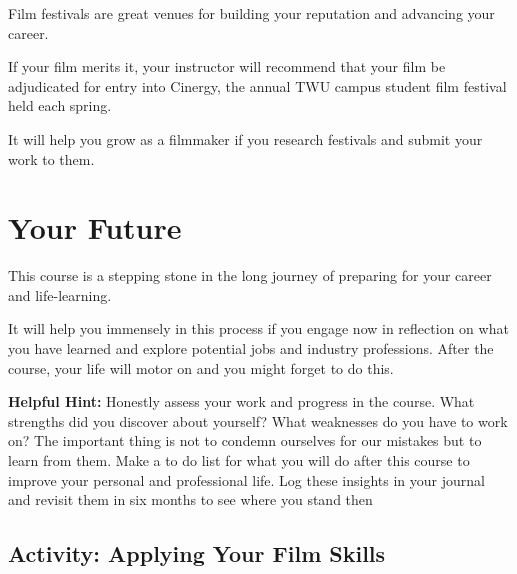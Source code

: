 \documentclass[
  letterpaper,
  DIV=11,
  numbers=noendperiod]{scrreprt}
\begin{document}
Film festivals are great venues for building your reputation and
advancing your career.

If your film merits it, your instructor will recommend that your film be
adjudicated for entry into Cinergy, the annual TWU campus student film
festival held each spring.

It will help you grow as a filmmaker if you research festivals and
submit your work to them.

\section{Your Future}\label{your-future}

This course is a stepping stone in the long journey of preparing for
your career and life-learning.

It will help you immensely in this process if you engage now in
reflection on what you have learned and explore potential jobs and
industry professions. After the course, your life will motor on and you
might forget to do this.

\textbf{Helpful Hint:} Honestly assess your work and progress in the
course. What strengths did you discover about yourself? What weaknesses
do you have to work on? The important thing is not to condemn ourselves
for our mistakes but to learn from them. Make a to do list for what you
will do after this course to improve your personal and professional
life. Log these insights in your journal and revisit them in six months
to see where you stand then

\subsection{Activity: Applying Your Film
Skills}\label{activity-applying-your-film-skills}
\end{document}

